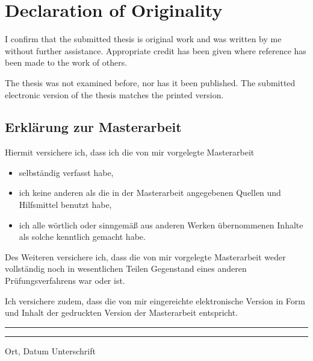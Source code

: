\section{Declaration of Originality}
I confirm that the submitted thesis is original work and was written by me without further assistance.
Appropriate credit has been given where reference has been made to the work of others.
\par
The thesis was not examined before, nor has it been published. The submitted electronic version of
the thesis matches the printed version. 


\subsection*{Erklärung zur Masterarbeit}
Hiermit versichere ich, dass ich die von mir vorgelegte Masterarbeit
\begin{itemize}
    \item selbständig verfasst habe,
    \item ich keine anderen als die in der Masterarbeit angegebenen Quellen und Hilfsmittel benutzt habe,
    \item ich alle wörtlich oder sinngemäß aus anderen Werken übernommenen Inhalte als solche kenntlich gemacht habe.
\end{itemize}

Des Weiteren versichere ich, dass die von mir vorgelegte Masterarbeit weder vollständig noch in
wesentlichen Teilen Gegenstand eines anderen Prüfungsverfahrens war oder ist.
\par
Ich versichere zudem, dass die von mir eingereichte elektronische Version in Form und Inhalt der
gedruckten Version der Masterarbeit entspricht.

\vspace{4cm}

\rule{5cm}{.4pt}\hfill\rule{5cm}{.4pt}\par
Ort, Datum \hfill Unterschrift \hspace{2cm}
